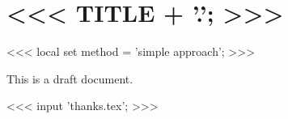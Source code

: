 \documentclass[a4paper,<<< FONT_SIZE; >>>]{article}
\newcommand{\description}[0]{a draft document}
\newcommand{\description}[0]{the final version}
\begin{document}
    \section{<<< TITLE + '.'; >>>}

    <<< local set method = 'simple approach'; >>>

    This is \description.

    <<< input 'thanks.tex'; >>>
\end{document}
